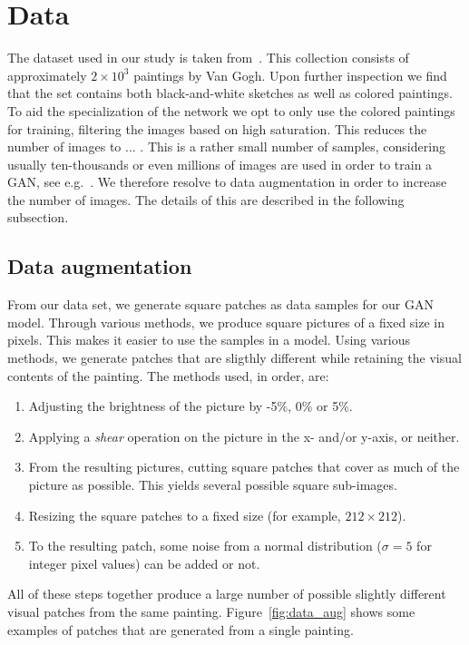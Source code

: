 \documentclass{article}
\begin{document}
\section{Data}

The dataset used in our study is taken from~\cite{kaggle_van_gogh}. This collection consists of approximately $2 \times 10^3$ paintings by Van Gogh. Upon further inspection we find that the set contains both black-and-white sketches as well as colored paintings. To aid the specialization of the network we opt to only use the colored paintings for training, filtering the images based on high saturation. This reduces the number of images to ... . This is a rather small number of samples, considering usually ten-thousands or even millions of images are used in order to train a GAN, see e.g.~\cite{radford2015unsupervised}. We therefore resolve to data augmentation in order to increase the number of images. The details of this are described in the following subsection.

\subsection{Data augmentation}

From our data set, we  generate square patches as data samples for our GAN model. Through various methods, we produce square pictures of a fixed size in pixels. This makes it easier to use the samples in a model. Using various methods, we generate patches that are sligthly different while retaining the visual contents of the painting. The methods used, in order, are:
\begin{enumerate}
    \item Adjusting the brightness of the picture by -5\%, 0\% or 5\%.
    \item Applying a \emph{shear} operation on the picture in the x- and/or y-axis, or neither.
    \item From the resulting pictures, cutting square patches that cover as much of the picture as possible. This yields several possible square sub-images.
    \item Resizing the square patches to a fixed size (for example, $212 \times 212$).
    \item To the resulting patch, some noise from a normal distribution ($\sigma = 5$ for integer pixel values) can be added or not.
\end{enumerate}
All of these steps together produce a large number of possible slightly different visual patches from the same painting. Figure~\ref{fig:data_aug} shows some examples of patches that are generated from a single painting.
\end{document}
